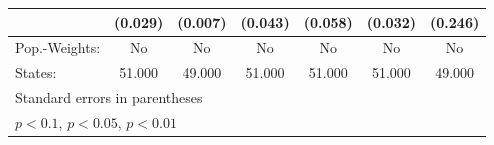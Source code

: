 {\begin{tabular}{l*{6}{c}}
            &     (0.029)         &     (0.007)         &     (0.043)         &     (0.058)         &     (0.032)         &     (0.246)         \\
\hline
Pop.-Weights:&          No         &          No         &          No         &          No         &          No         &          No         \\
States:     &      51.000         &      49.000         &      51.000         &      51.000         &      51.000         &      49.000         \\
\hline\hline
\multicolumn{7}{l}{\footnotesize Standard errors in parentheses}\\
\multicolumn{7}{l}{\footnotesize \sym{*} \(p<0.1\), \sym{**} \(p<0.05\), \sym{***} \(p<0.01\)}\\
\end{tabular}
}
